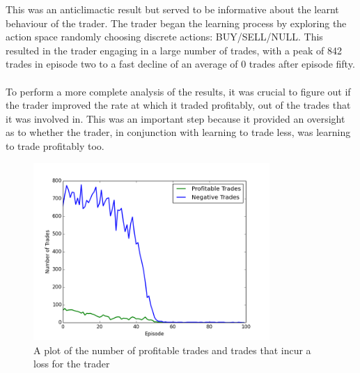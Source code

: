 \documentclass[ %
                    author={Ashwinder Khurana},
                supervisor={Prof Dave Cliff},
                    degree={MEng},
                     title={The Deeply Reinforced Trader},
                  subtitle={},
                      type={enterprise},
                      year={2020} ]{dissertation}
\begin{document}
{\noindent
This was an anticlimactic result but served to be informative about the learnt behaviour of the trader. The trader began the learning process by exploring the action space randomly choosing discrete actions: BUY/SELL/NULL. This resulted in the trader engaging in a large number of trades, with a peak of 842 trades in episode two to a fast decline of an average of 0 trades after episode fifty. 
\\
\\
\noindent
To perform a more complete analysis of the results, it was crucial to figure out if the trader improved the rate at which it traded profitably, out of the trades that it was involved in. This was an important step because it provided an oversight as to whether the trader, in conjunction with learning to trade less, was learning to trade profitably too.

\begin{figure}[H] 
	\centering
  	\includegraphics[width=0.8\textwidth]{PG-Vanilla-Good-Vs-Bad-Trades.png}
  	\caption{A plot of the number of profitable trades and trades that incur a loss for the trader }
	\label{fig:PG-Vanilla-Good-Vs-Bad}  
\end{figure}

}
\end{document}
